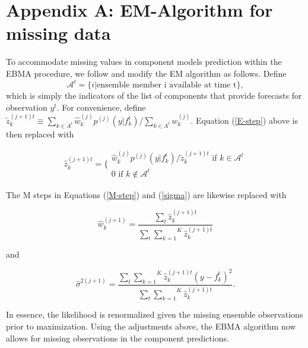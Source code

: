 \documentclass[12pt,fullpage,endnotes]{article}
\begin{document}
 \newpage
 \appendix

\doublespacing

 \section*{Appendix A: EM-Algorithm for missing data}

To accommodate missing values in component models prediction within
the EBMA procedure, we follow \citet{Fraley:2010} and modify the EM
algorithm as follows.  Define $$\mathcal{A}^t = \{i|\mbox{ensemble
  member i available at time t}\},$$\noindent which is simply the
indicators of the list of components that provide forecasts for
observation $y^t$.  For convenience, define $\tilde{z}_k^{(j+1)t}
\equiv {{\underset{k \in
      A^t}{\sum}}\hat{w}^{(j)}_kp^{(j)}(y|f_{k}^{t})}/{\underset{k \in
    A^t}\sum w_k^{(j)}}$.  Equation (\ref{E-step}) above is then
replaced with

\begin{equation}
\hat{z}^{(j+1)t}_{k} = \Bigg\{ \begin{array}{c} {\hat{w}^{(j)}_k p^{(j)}(y|f_{k}^{t})}/{\tilde{z}_k^{(j+1)t} } \mbox{ if } k \in \mathcal{A}^t\\ 0 \mbox{ if } k \notin \mathcal{A}^t \end{array}
\end{equation}



\noindent  The M steps in Equations (\ref{M-step}) and (\ref{sigma}) are likewise replaced with

\begin{equation}
\hat{w}^{(j+1)}_k=\frac{\underset{t}{\sum}\hat{z}^{(j+1)t}_{k}}{\underset{t}{\sum}\overset{K}{\underset{k=1}{ \sum}} \hat{z}_k^{(j+1)t}}
\end{equation}


\noindent and

\begin{equation}
\hat{\sigma}^{2(j+1)}=\frac{\underset{t}{\sum}\overset{K}{\underset{k=1}{\sum}}\hat{z}^{(j+1)t}_{k}(y-f_{k}^{t})^2 }{\underset{t}{\sum}\overset{K}{\underset{k=1}{ \sum}} \hat{z}_k^{(j+1)t}}.
\end{equation}

\noindent In essence, the likelihood is renormalized given the missing
ensemble observations prior to maximization. Using the adjustments
above, the EBMA algorithm now allows for missing observations in the
component predictions.
\end{document}
